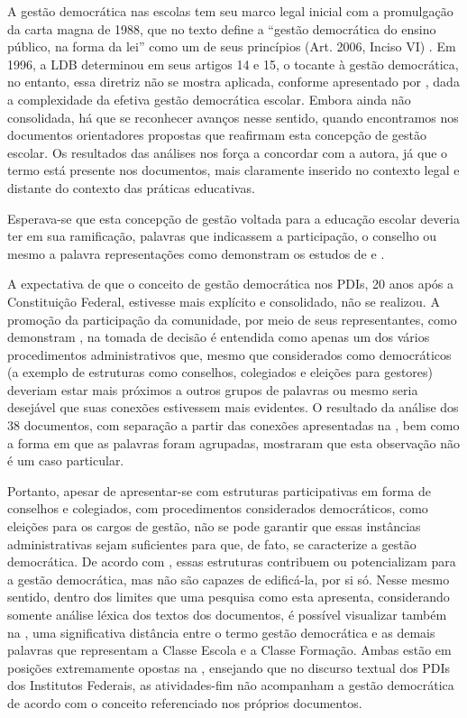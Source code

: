 \documentclass[portuguese]{textolivre}
\begin{document}
A gestão democrática nas escolas tem seu marco legal inicial com a promulgação da carta magna de 1988, que no texto define a “gestão democrática do ensino público, na forma da lei” como um de seus princípios (Art. 2006, Inciso VI) \cite{brasil__constituicao_nodate}. Em 1996, a LDB determinou em seus artigos 14 e 15, o tocante à gestão democrática, no entanto, essa diretriz não se mostra aplicada, conforme apresentado por \textcite{luck_gestao_2006}, dada a complexidade da efetiva gestão democrática escolar. Embora ainda não consolidada, há que se reconhecer avanços nesse sentido, quando encontramos nos documentos orientadores propostas que reafirmam esta concepção de gestão escolar. Os resultados das análises nos força a concordar com a autora, já que o termo está presente nos documentos, mais claramente inserido no contexto legal e distante do contexto das práticas educativas.

Esperava-se que esta concepção de gestão voltada para a educação escolar deveria ter em sua ramificação, palavras que indicassem a participação, o conselho ou mesmo a palavra representações como demonstram os estudos de \textcite{fernandes_construcao_2009} e \textcite{souza_o_2018}.

A expectativa de que o conceito de gestão democrática nos PDIs, 20 anos após a Constituição Federal, estivesse mais explícito e consolidado, não se realizou. A promoção da participação da comunidade, por meio de seus representantes, como demonstram  \textcite{diniz_junior_os_2019}, na tomada de decisão é entendida como apenas um dos vários procedimentos administrativos que, mesmo que considerados como democráticos (a exemplo de estruturas como conselhos, colegiados e eleições para gestores) deveriam estar mais próximos a outros grupos de palavras ou mesmo seria desejável que suas conexões estivessem mais evidentes. O resultado da análise dos 38 documentos, com separação a partir das conexões apresentadas na , bem como a forma em que as palavras foram agrupadas, mostraram que esta observação não é um caso particular.

Portanto, apesar de apresentar-se com estruturas participativas em forma de conselhos e colegiados, com procedimentos considerados democráticos, como eleições para os cargos de gestão, não se pode garantir que essas instâncias administrativas sejam suficientes para que, de fato, se caracterize a gestão democrática. De acordo com \textcite{souza_as_2019}, essas estruturas contribuem ou potencializam para a gestão democrática, mas não são capazes de edificá-la, por si só. Nesse mesmo sentido, dentro dos limites que uma pesquisa como esta apresenta, considerando somente análise léxica dos textos dos documentos, é possível visualizar também na , uma significativa distância entre o termo gestão democrática e as demais palavras que representam a Classe Escola e a Classe Formação. Ambas estão em posições extremamente opostas na , ensejando que no discurso textual dos PDIs dos Institutos Federais, as atividades-fim não acompanham a gestão democrática de acordo com o conceito referenciado nos próprios documentos.
\end{document}
